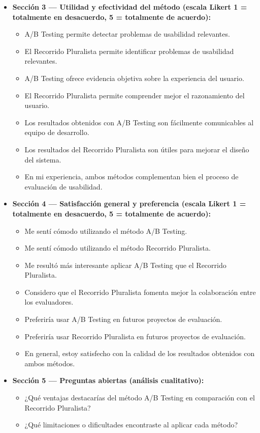 \documentclass[a4paper,12pt]{report}
\begin{document}
\begin{itemize}
    \item \textbf{Sección 3 — Utilidad y efectividad del método (escala Likert 1 = totalmente en desacuerdo, 5 = totalmente de acuerdo):}
    \begin{itemize}
        \item A/B Testing permite detectar problemas de usabilidad relevantes.
        \item El Recorrido Pluralista permite identificar problemas de usabilidad relevantes.
        \item A/B Testing ofrece evidencia objetiva sobre la experiencia del usuario.
        \item El Recorrido Pluralista permite comprender mejor el razonamiento del usuario.
        \item Los resultados obtenidos con A/B Testing son fácilmente comunicables al equipo de desarrollo.
        \item Los resultados del Recorrido Pluralista son útiles para mejorar el diseño del sistema.
        \item En mi experiencia, ambos métodos complementan bien el proceso de evaluación de usabilidad.
    \end{itemize}

    \item \textbf{Sección 4 — Satisfacción general y preferencia (escala Likert 1 = totalmente en desacuerdo, 5 = totalmente de acuerdo):}
    \begin{itemize}
        \item Me sentí cómodo utilizando el método A/B Testing.
        \item Me sentí cómodo utilizando el método Recorrido Pluralista.
        \item Me resultó más interesante aplicar A/B Testing que el Recorrido Pluralista.
        \item Considero que el Recorrido Pluralista fomenta mejor la colaboración entre los evaluadores.
        \item Preferiría usar A/B Testing en futuros proyectos de evaluación.
        \item Preferiría usar Recorrido Pluralista en futuros proyectos de evaluación.
        \item En general, estoy satisfecho con la calidad de los resultados obtenidos con ambos métodos.
    \end{itemize}

    \item \textbf{Sección 5 — Preguntas abiertas (análisis cualitativo):}
    \begin{itemize}
        \item ¿Qué ventajas destacarías del método A/B Testing en comparación con el Recorrido Pluralista?
        \item ¿Qué limitaciones o dificultades encontraste al aplicar cada método?
    \end{itemize}
\end{itemize}
\end{document}
